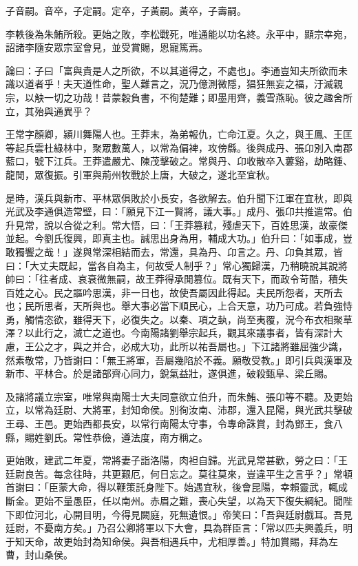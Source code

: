 \begin{pinyinscope}
子音嗣。音卒，子定嗣。定卒，子黃嗣。黃卒，子壽嗣。

李軼後為朱鮪所殺。更始之敗，李松戰死，唯通能以功名終。永平中，顯宗幸宛，詔諸李隨安眾宗室會見，並受賞賜，恩寵篤焉。

論曰：子曰「富與貴是人之所欲，不以其道得之，不處也」。李通豈知夫所欲而未識以道者乎！夫天道性命，聖人難言之，況乃億測微隱，猖狂無妄之福，汙滅親宗，以觖一切之功哉！昔蒙穀負書，不徇楚難；即墨用齊，義雪燕恥。彼之趣舍所立，其殆與通異乎？

王常字顏卿，潁川舞陽人也。王莽末，為弟報仇，亡命江夏。久之，與王鳳、王匡等起兵雲杜綠林中，聚眾數萬人，以常為偏裨，攻傍縣。後與成丹、張卬別入南郡藍口，號下江兵。王莽遣嚴尤、陳茂擊破之。常與丹、卬收散卒入蔞谿，劫略鍾、龍閒，眾復振。引軍與荊州牧戰於上唐，大破之，遂北至宜秋。

是時，漢兵與新巿、平林眾俱敗於小長安，各欲解去。伯升聞下江軍在宜秋，即與光武及李通俱造常壁，曰：「願見下江一賢將，議大事。」成丹、張卬共推遣常。伯升見常，說以合從之利。常大悟，曰：「王莽篡弒，殘虐天下，百姓思漢，故豪傑並起。今劉氏復興，即真主也。誠思出身為用，輔成大功。」伯升曰：「如事成，豈敢獨饗之哉！」遂與常深相結而去，常還，具為丹、卬言之。丹、卬負其眾，皆曰：「大丈夫既起，當各自為主，何故受人制乎？」常心獨歸漢，乃稍曉說其說將帥曰：「往者成、哀衰微無嗣，故王莽得承閒篡位。既有天下，而政令苛酷，積失百姓之心。民之謳吟思漢，非一日也，故使吾屬因此得起。夫民所怨者，天所去也；民所思者，天所與也。舉大事必當下順民心，上合天意，功乃可成。若負強恃勇，觸情恣欲，雖得天下，必復失之。以秦、項之埶，尚至夷覆，況今布衣相聚草澤？以此行之，滅亡之道也。今南陽諸劉舉宗起兵，觀其來議事者，皆有深計大慮，王公之才，與之并合，必成大功，此所以祐吾屬也。」下江諸將雖屈強少識，然素敬常，乃皆謝曰：「無王將軍，吾屬幾陷於不義。願敬受教。」即引兵與漢軍及新巿、平林合。於是諸部齊心同力，銳氣益壯，遂俱進，破殺甄阜、梁丘賜。

及諸將議立宗室，唯常與南陽士大夫同意欲立伯升，而朱鮪、張卬等不聽。及更始立，以常為廷尉、大將軍，封知命侯。別徇汝南、沛郡，還入昆陽，與光武共擊破王尋、王邑。更始西都長安，以常行南陽太守事，令專命誅賞，封為鄧王，食八縣，賜姓劉氏。常性恭儉，遵法度，南方稱之。

更始敗，建武二年夏，常將妻子詣洛陽，肉袒自歸。光武見常甚歡，勞之曰：「王廷尉良苦。每念往時，共更艱厄，何日忘之。莫往莫來，豈違平生之言乎？」常頓首謝曰：「臣蒙大命，得以鞭策託身陛下。始遇宜秋，後會昆陽，幸賴靈武，輒成斷金。更始不量愚臣，任以南州。赤眉之難，喪心失望，以為天下復失綱紀。聞陛下即位河北，心開目明，今得見闕庭，死無遺恨。」帝笑曰：「吾與廷尉戲耳。吾見廷尉，不憂南方矣。」乃召公卿將軍以下大會，具為群臣言：「常以匹夫興義兵，明于知天命，故更始封為知命侯。與吾相遇兵中，尤相厚善。」特加賞賜，拜為左曹，封山桑侯。


\end{pinyinscope}
